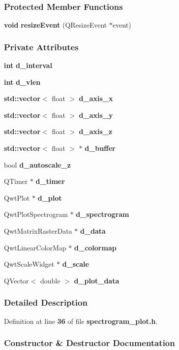 \subsubsection*{Protected Member Functions}
\begin{DoxyCompactItemize}
\item 
{\bf void} {\bf resize\+Event} (Q\+Resize\+Event $\ast$event)
\end{DoxyCompactItemize}
\subsubsection*{Private Attributes}
\begin{DoxyCompactItemize}
\item 
{\bf int} {\bf d\+\_\+interval}
\item 
{\bf int} {\bf d\+\_\+vlen}
\item 
{\bf std\+::vector}$<$ float $>$ {\bf d\+\_\+axis\+\_\+x}
\item 
{\bf std\+::vector}$<$ float $>$ {\bf d\+\_\+axis\+\_\+y}
\item 
{\bf std\+::vector}$<$ float $>$ {\bf d\+\_\+axis\+\_\+z}
\item 
{\bf std\+::vector}$<$ float $>$ $\ast$ {\bf d\+\_\+buffer}
\item 
bool {\bf d\+\_\+autoscale\+\_\+z}
\item 
Q\+Timer $\ast$ {\bf d\+\_\+timer}
\item 
Qwt\+Plot $\ast$ {\bf d\+\_\+plot}
\item 
Qwt\+Plot\+Spectrogram $\ast$ {\bf d\+\_\+spectrogram}
\item 
Qwt\+Matrix\+Raster\+Data $\ast$ {\bf d\+\_\+data}
\item 
Qwt\+Linear\+Color\+Map $\ast$ {\bf d\+\_\+colormap}
\item 
Qwt\+Scale\+Widget $\ast$ {\bf d\+\_\+scale}
\item 
Q\+Vector$<$ double $>$ {\bf d\+\_\+plot\+\_\+data}
\end{DoxyCompactItemize}


\subsubsection{Detailed Description}


Definition at line {\bf 36} of file {\bf spectrogram\+\_\+plot.\+h}.



\subsubsection{Constructor \& Destructor Documentation}
